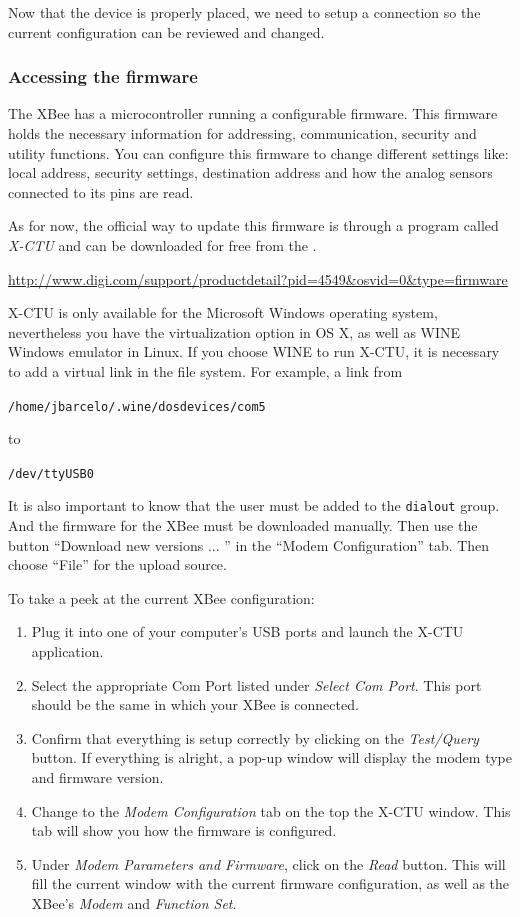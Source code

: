Now that the device is properly placed, we need to setup a connection so the current configuration can be reviewed and changed.

\subsubsection{Accessing the firmware}\label{xbeeRoleConfiguration}

The XBee has a microcontroller running a configurable firmware. This firmware holds the necessary information for addressing, communication, security and utility functions. You can configure this firmware to change different settings like: local address, security settings, destination address and how the analog sensors connected to its pins are read.

As for now, the official way to update this firmware is through a program called \emph{X-CTU} and can be downloaded for free from the \emph{}.

\url{http://www.digi.com/support/productdetail?pid=4549&osvid=0&type=firmware}

X-CTU is only available for the Microsoft Windows operating system, nevertheless you have the virtualization option in OS X, as well as WINE Windows emulator in Linux. 
If you choose WINE to run X-CTU, it is necessary to add a virtual link in the file system.
For example, a link from

\texttt{/home/jbarcelo/.wine/dosdevices/com5} 

to

\texttt{/dev/ttyUSB0}

It is also important to know that the user must be added to the \texttt{dialout} group.
And the firmware for the XBee must be downloaded manually.
Then use the button ``Download new versions ... '' in the ``Modem Configuration'' tab.
Then choose ``File'' for the upload source.

To take a peek at the current XBee configuration: 

\begin{enumerate}
	\item Plug it into one of your computer's USB ports and launch the X-CTU application.
	\item Select the appropriate Com Port listed under \emph{Select Com Port}. This port should be the same in which your XBee is connected.
	\item Confirm that everything is setup correctly by clicking on the \emph{Test/Query} button. If everything is alright, a pop-up window will display the modem type and firmware version.
	\item Change to the \emph{Modem Configuration} tab on the top the X-CTU window. This tab will show you how the firmware is configured.
	\item Under \emph{Modem Parameters and Firmware}, click on the \emph{Read} button. This will fill the current window with the current firmware configuration, as well as the XBee's \emph{Modem} and \emph{Function Set}.
\end{enumerate}

